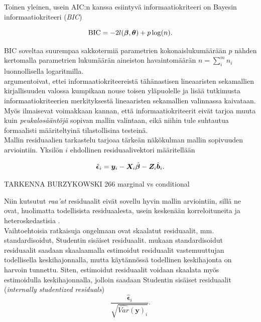 \documentclass[finnish]{docopts}
\begin{document}
 Toinen yleinen, usein AIC:n kanssa esiintyvä informaatiokriteeri on Bayesin informaatiokriteeri (\textit{BIC})
 
 $$
 \text{BIC} = -2l(\bm{\beta}, \bm{\theta})+p\log(n).\\
 $$
 
 BIC soveltaa suurempaa sakkotermiä parametrien kokonaislukumäärään $p$ nähden kertomalla parametrien lukumäärän aineiston havaintomäärän $n = \sum\limits_{i}^m n_i$ luonnollisella logaritmilla.\\
 
 \cite{west14} argumentoivat, ettei informaatiokriteereistä tähänastisen lineaaristen sekamallien kirjallisuuden valossa kumpikaan nouse toisen yläpuolelle ja lisää tutkimusta informaatiokriteerien merkityksestä lineaaristen sekamallien valinnassa kaivataan.\\
 
 Myös \cite{verbeke00} ilmaisevat voimakkaan kannan, että informaatiokriteerit eivät tarjoa muuta kuin \textit{peukalosääntöjä} sopivan mallin valintaan, eikä niihin tule suhtautua formaalisti määriteltyinä tilastollisina testeinä. \\
 
 Mallin residuaalien tarkastelu tarjoaa tärkeän näkökulman mallin sopivuuden arviointiin. Yksilön $i$ ehdollinen residuaalivektori määritellään
 
 $$
\hat{\bm{\epsilon}}_i = \bm{y}_i - \bm{X}_i \hat{\bm{\beta}} - \bm{Z}_i \hat{\bm{b}}_i. \\
 $$
 
 TARKENNA BURZYKOWSKI 266 marginal vs conditional
 
 Niin kutsutut \textit{raa'at} residuaalit eivät sovellu hyvin mallin arviointiin, sillä ne ovat, huolimatta todellisista residuaalesta, usein keskenään korreloituneita ja heteroskedastisia \cite{west14}.\\
 
 Vaihtoehtoisia ratkaisuja ongelmaan ovat skaalatut residuaalit, mm. standardisoidut, Studentin sisäiset residuaalit. \cite{burzykowski13} mukaan standardisoidut residuaalit saadaan skaalaamalla estimoidut residuaalit vastemuuttujan todellisella keskihajonnalla, mutta käytännössä todellinen keskihajonta on harvoin tunnettu. Siten, estimoidut residuaalit voidaan skaalata myös estimoidulla keskihajonnalla, jolloin saadaan Studentin sisäiset residuaalit (\textit{internally studentized residuals})\\
 
 $$
 \frac{\hat{\bm{\epsilon}}_i}{\sqrt{\widehat{Var}(\bm{y})_i}}.
 $$
 
\end{document}
